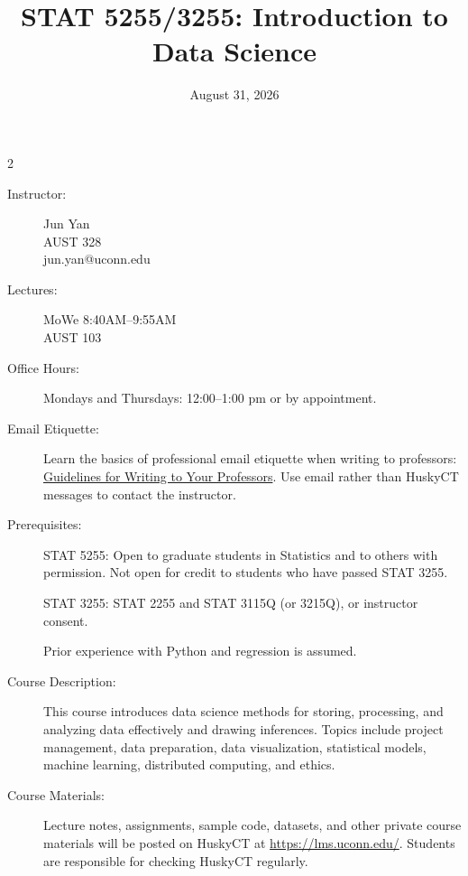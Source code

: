 \documentclass{article}
\begin{document}
\title{STAT 5255/3255: Introduction to Data Science}
\date{August 31, 2026}
\maketitle

\thispagestyle{fancy}

\begin{multicols}{2}
\begin{description}
\item[Instructor:]
  Jun Yan\\
  AUST 328\\
  jun.yan@uconn.edu

\item[Lectures:]
  MoWe 8:40AM--9:55AM\\
  AUST 103

\item[Office Hours:]
  Mondays and Thursdays: 12:00--1:00 pm
  or by appointment.

\item[Email Etiquette:]
  Learn the basics of professional email etiquette when writing to
  professors:
  \href{https://marktomforde.com/academic/undergraduates/Email-Etiquette.html}{Guidelines for Writing to Your Professors}.
  Use email rather than HuskyCT messages to contact the instructor.

\item[Prerequisites:] \hspace{0pt}

  STAT 5255: Open to graduate students in Statistics and to others with
  permission. Not open for credit to students who have passed STAT 3255.

  STAT 3255: STAT 2255 and STAT 3115Q (or 3215Q), or instructor consent.

  Prior experience with Python and regression is assumed.

\item[Course Description:]
  This course introduces data science methods for storing, processing, and
  analyzing data effectively and drawing inferences. Topics
  include project management, data preparation, data visualization,
  statistical models, machine learning, distributed computing, and ethics.

\item[Course Materials:]
  Lecture notes, assignments, sample code, datasets, and other private course
  materials will be posted on HuskyCT at \url{https://lms.uconn.edu/}.
  Students are responsible for checking HuskyCT regularly.


\end{description}
\end{multicols}
\end{document}
